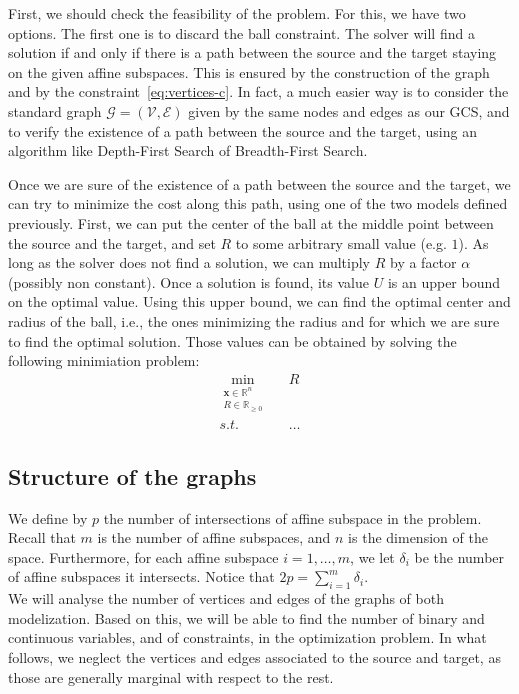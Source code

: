 \documentclass[a4paper, 12pt]{article}
\begin{document}
First, we should check the feasibility of the problem. For this, we have two options. The first one is to discard the ball constraint. The solver will find a solution if and only if there is a path between the source and the target staying on the given affine subspaces. This is ensured by the construction of the graph and by the constraint~\ref{eq:vertices-c}. In fact, a much easier way is to consider the standard graph $\mathcal{G} = (\mathcal{V}, \mathcal{E})$ given by the same nodes and edges as our GCS, and to verify the existence of a path between the source and the target, using an algorithm like Depth-First Search of Breadth-First Search.

Once we are sure of the existence of a path between the source and the target, we can try to minimize the cost along this path, using one of the two models defined previously. First, we can put the center of the ball at the middle point between the source and the target, and set $R$ to some arbitrary small value (e.g. $1$). As long as the solver does not find a solution, we can multiply $R$ by a factor $\alpha$ (possibly non constant). Once a solution is found, its value $U$ is an upper bound on the optimal value. Using this upper bound, we can find the optimal center and radius of the ball, i.e., the ones minimizing the radius and for which we are sure to find the optimal solution. Those values can be obtained by solving the following minimiation problem:
\begin{equation}
    \begin{aligned}
        \min_{\substack{\mathbf{x} \in \mathbb{R}^n \\ R \in \mathbb{R}_{\geq 0}}} && R\\
        s.t. && \dots
    \end{aligned}
\end{equation}

\subsection{Structure of the graphs}
We define by $p$ the number of intersections of affine subspace in the problem. Recall that $m$ is the number of affine subspaces, and $n$ is the dimension of the space. Furthermore, for each affine subspace $i = 1, \dots, m$, we let $\delta_i$ be the number of affine subspaces it intersects. Notice that $2p = \sum_{i=1}^m \delta_i$.\\
We will analyse the number of vertices and edges of the graphs of both modelization. Based on this, we will be able to find the number of binary and continuous variables, and of constraints, in the optimization problem. In what follows, we neglect the vertices and edges associated to the source and target, as those are generally marginal with respect to the rest.
\end{document}
